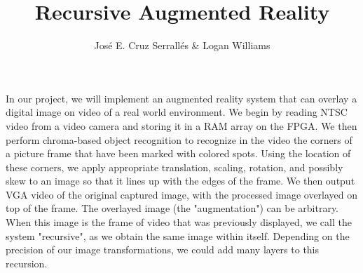 \documentclass[12pt]{amsart}
\title{Recursive Augmented Reality}
\author{Jos\'{e} E. Cruz Serrall\'{e}s \& Logan Williams}
\date{}
\begin{document}
\maketitle

In our project, we will implement an augmented reality system that can overlay a digital image on video of a real world environment. We begin by reading NTSC video from a video camera and storing it in a RAM array on the FPGA. We then perform chroma-based object recognition to recognize in the video the corners of a picture frame that have been marked with colored spots. Using the location of these corners, we apply appropriate translation, scaling, rotation, and possibly skew to an image so that it lines up with the edges of the frame. We then output VGA video of the original captured image, with the processed image overlayed on top of the frame. The overlayed image (the "augmentation") can be arbitrary. When this image is the frame of video that was previously displayed, we call the system "recursive", as we obtain the same image within itself. Depending on the precision of our image transformations, we could add many layers to this recursion.
\end{document}
